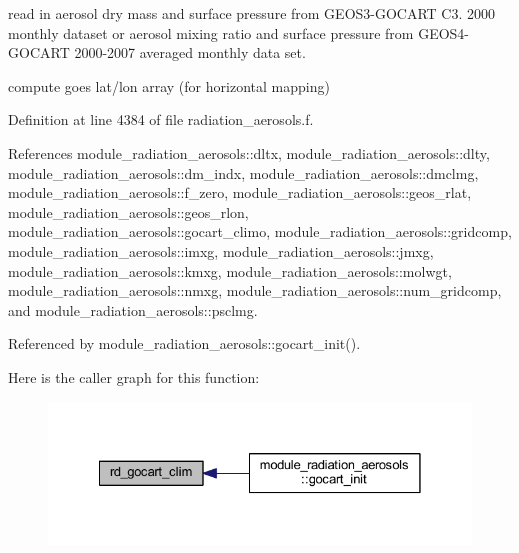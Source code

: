 \begin{DoxyEnumerate}
\item read in aerosol dry mass and surface pressure from G\+E\+O\+S3-\/\+G\+O\+C\+A\+RT C3. 2000 monthly dataset or aerosol mixing ratio and surface pressure from G\+E\+O\+S4-\/\+G\+O\+C\+A\+RT 2000-\/2007 averaged monthly data set.
\item compute goes lat/lon array (for horizontal mapping) 
\end{DoxyEnumerate}

Definition at line 4384 of file radiation\+\_\+aerosols.\+f.



References module\+\_\+radiation\+\_\+aerosols\+::dltx, module\+\_\+radiation\+\_\+aerosols\+::dlty, module\+\_\+radiation\+\_\+aerosols\+::dm\+\_\+indx, module\+\_\+radiation\+\_\+aerosols\+::dmclmg, module\+\_\+radiation\+\_\+aerosols\+::f\+\_\+zero, module\+\_\+radiation\+\_\+aerosols\+::geos\+\_\+rlat, module\+\_\+radiation\+\_\+aerosols\+::geos\+\_\+rlon, module\+\_\+radiation\+\_\+aerosols\+::gocart\+\_\+climo, module\+\_\+radiation\+\_\+aerosols\+::gridcomp, module\+\_\+radiation\+\_\+aerosols\+::imxg, module\+\_\+radiation\+\_\+aerosols\+::jmxg, module\+\_\+radiation\+\_\+aerosols\+::kmxg, module\+\_\+radiation\+\_\+aerosols\+::molwgt, module\+\_\+radiation\+\_\+aerosols\+::nmxg, module\+\_\+radiation\+\_\+aerosols\+::num\+\_\+gridcomp, and module\+\_\+radiation\+\_\+aerosols\+::psclmg.



Referenced by module\+\_\+radiation\+\_\+aerosols\+::gocart\+\_\+init().



Here is the caller graph for this function\+:
\nopagebreak
\begin{figure}[H]
\begin{center}
\leavevmode
\includegraphics[width=328pt]{radiation__aerosols_8f_a15bad8499ffd17d967e5788cd6721c4d_icgraph}
\end{center}
\end{figure}


